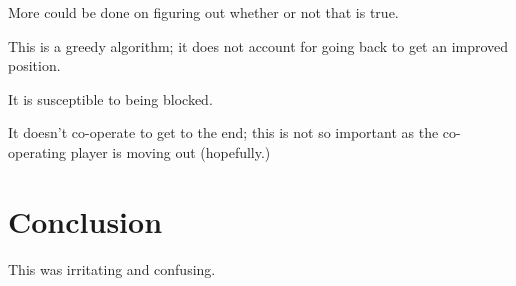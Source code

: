 \documentclass[twocolumn]{article}
\begin{document}
More could be done on figuring out whether or not that is true.

This is a greedy algorithm; it does not account for going back to get an improved position.

It is susceptible to being blocked.

It doesn't co-operate to get to the end; this is not so important as the co-operating player is moving out (hopefully.)

\section{Conclusion}

This was irritating and confusing.


\end{document}
